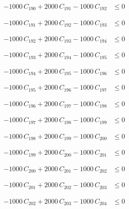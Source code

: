 \documentclass[a4paper,11pt]{article}
\begin{document}
\begin{align}
-1000\,C_{190} + 2000\,C_{191} - 1000\,C_{192} &\leq 0 \nonumber
\end{align}

\begin{align}
-1000\,C_{191} + 2000\,C_{192} - 1000\,C_{193} &\leq 0 \nonumber
\end{align}

\begin{align}
-1000\,C_{192} + 2000\,C_{193} - 1000\,C_{194} &\leq 0 \nonumber
\end{align}

\begin{align}
-1000\,C_{193} + 2000\,C_{194} - 1000\,C_{195} &\leq 0 \nonumber
\end{align}

\begin{align}
-1000\,C_{194} + 2000\,C_{195} - 1000\,C_{196} &\leq 0 \nonumber
\end{align}

\begin{align}
-1000\,C_{195} + 2000\,C_{196} - 1000\,C_{197} &\leq 0 \nonumber
\end{align}

\begin{align}
-1000\,C_{196} + 2000\,C_{197} - 1000\,C_{198} &\leq 0 \nonumber
\end{align}

\begin{align}
-1000\,C_{197} + 2000\,C_{198} - 1000\,C_{199} &\leq 0 \nonumber
\end{align}

\begin{align}
-1000\,C_{198} + 2000\,C_{199} - 1000\,C_{200} &\leq 0 \nonumber
\end{align}

\begin{align}
-1000\,C_{199} + 2000\,C_{200} - 1000\,C_{201} &\leq 0 \nonumber
\end{align}

\begin{align}
-1000\,C_{200} + 2000\,C_{201} - 1000\,C_{202} &\leq 0 \nonumber
\end{align}

\begin{align}
-1000\,C_{201} + 2000\,C_{202} - 1000\,C_{203} &\leq 0 \nonumber
\end{align}

\begin{align}
-1000\,C_{202} + 2000\,C_{203} - 1000\,C_{204} &\leq 0 \nonumber
\end{align}
\end{document}
